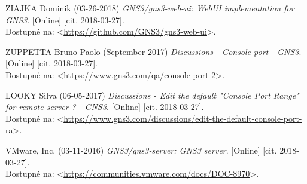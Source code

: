 \begin{thebibliography}{99}
ZIAJKA Dominik (03-26-2018) {\it GNS3/gns3-web-ui: WebUI implementation for GNS3}. [Online] [cit. 2018-03-27]. \\
Dostupné na: <\url{https://github.com/GNS3/gns3-web-ui}>.

ZUPPETTA Bruno Paolo (September 2017) {\it Discussions - Console port - GNS3}. [Online] [cit. 2018-03-27]. \\
Dostupné na: <\url{https://www.gns3.com/qa/console-port-2}>.

LOOKY Silva (06-05-2017) {\it Discussions - Edit the default "Console Port Range" for remote server ? - GNS3}. [Online] [cit. 2018-03-27]. \\
Dostupné na: <\url{https://www.gns3.com/discussions/edit-the-default-console-port-ra}>.

VMware, Inc. (03-11-2016) {\it GNS3/gns3-server: GNS3 server}. [Online] [cit. 2018-03-27]. \\
Dostupné na: <\url{https://communities.vmware.com/docs/DOC-8970}>.

\end{thebibliography}

